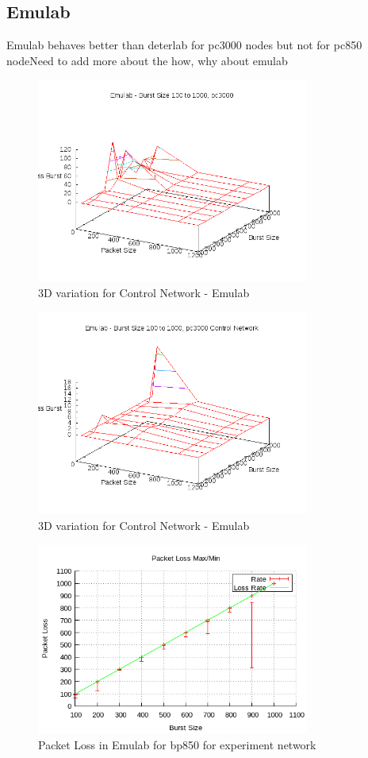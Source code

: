 \documentclass[11pt]{article}
\begin{document}
\subsection{Emulab}
Emulab behaves better than deterlab for pc3000 nodes but not for pc850 node{Need to add more about the how, why about emulab}
\begin{figure}[!ht]
\centering
\includegraphics[width=0.8\textwidth]{3Demulab.png}
\caption{3D variation for Control Network - Emulab}
\end{figure}
\FloatBarrier
\begin{figure}[!ht]
\centering
\includegraphics[width=0.8\textwidth]{3Demulab2.png}
\caption{3D variation for Control Network - Emulab}
\end{figure}
\FloatBarrier
\begin{figure}[!ht]
\centering
\includegraphics[width=0.8\textwidth]{EM.png}
\caption{Packet Loss in Emulab for bp850 for experiment network}
\end{figure}
\end{document}
